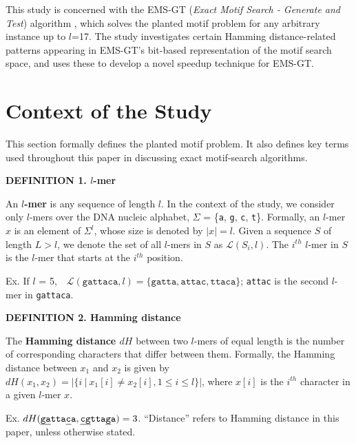 \documentclass[oneside,12pt]{DISCSthesis}
\begin{document}
		This study is concerned with the EMS-GT (\emph{Exact Motif Search - Generate and Test}) algorithm \cite{nabos2015dissertation}, which solves the planted motif problem for any arbitrary instance up to $l$=17. The study investigates certain Hamming distance-related patterns appearing in EMS-GT's bit-based representation of the motif search space, and uses these to develop a novel speedup technique for EMS-GT.

	\newpage
	\section{Context of the Study}
		This section formally defines the planted motif problem. It also defines key terms used throughout this paper in discussing exact motif-search algorithms.\vspace{5mm}

		\noindent\textbf{\boldmath DEFINITION 1. $l$-mer}

		\noindent An \textbf{\boldmath $l$-mer} is any sequence of length $l$. In the context of the study, we consider only $l$-mers over the DNA nucleic alphabet, $\Sigma$ = \{\texttt{a}, \texttt{g}, \texttt{c}, \texttt{t}\}. Formally, an $l$-mer $x$ is an element of $\Sigma^l$, whose size is denoted by $|x| = l$. Given a sequence $S$ of length $L > l$, we denote the set of all $l$-mers in $S$ as $\mathcal{L}(S_i, l)$. The $i^{th}$ $l$-mer in $S$ is the $l$-mer that starts at the $i^{th}$ position.

		\noindent \hspace*{35pt} Ex. If $l$ = 5,\ \ $\mathcal{L}(\texttt{gattaca}, l)= \{\texttt{gatta},\texttt{attac},\texttt{ttaca}\}$;
		\newline\hspace*{55pt}	\texttt{attac} is the second $l$-mer in \texttt{gattaca}.\newline

		\noindent\textbf{\boldmath DEFINITION 2. Hamming distance}

		\noindent The \textbf{\boldmath Hamming distance $dH$} between two $l$-mers of equal length is the number of corresponding characters that differ between them. Formally, the Hamming distance between $x_1$ and $x_2$ is given by $ dH(x_1, x_2) = | \{i\ |\ x_1[i] \neq x_2[i], 1 \leq i \leq l\} |$, where $x[i]$ is the $i^{th}$ character in a given $l$-mer $x$.

		\noindent \hspace*{35pt} Ex. $dH(\texttt{\ul{ga}tta\ul{c}a}, \texttt{\ul{cg}tta\ul{g}a}) = 3$. \newline
		\noindent ``Distance'' refers to Hamming distance in this paper, unless otherwise stated.\newline
\end{document}
